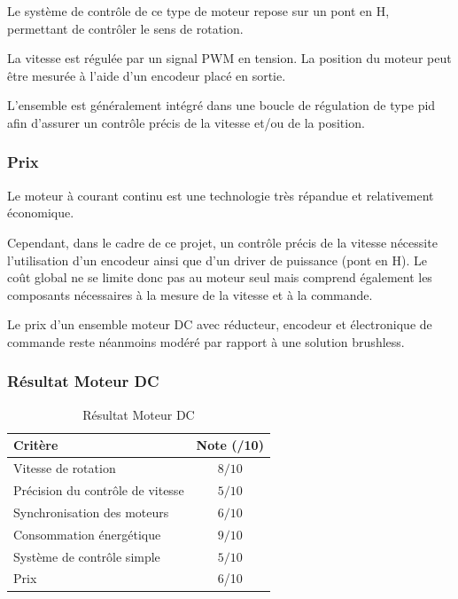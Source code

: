 Le système de contrôle de ce type de moteur repose sur un pont en H, permettant de contrôler le sens de rotation.

La vitesse est régulée par un signal PWM en tension. La position du moteur peut être mesurée à l'aide d'un encodeur placé en sortie.

L'ensemble est généralement intégré dans une boucle de régulation de type \Gls{pid} afin d'assurer un contrôle précis de la vitesse et/ou de la position.
\subsubsection{Prix}

Le moteur à courant continu est une technologie très répandue et relativement économique.

Cependant, dans le cadre de ce projet, un contrôle précis de la vitesse nécessite l'utilisation d'un encodeur ainsi que d'un driver de puissance (pont en H). Le coût global ne se limite donc pas au moteur seul mais comprend également les composants nécessaires à la mesure de la vitesse et à la commande.

Le prix d'un ensemble moteur DC avec réducteur, encodeur et électronique de commande reste néanmoins modéré par rapport à une solution brushless.

\subsubsection{Résultat Moteur DC}

\begin{table}[H]
    \centering
    \begin{tabular}{|l|c|}
        \hline
        \textbf{Critère} & \textbf{Note (/10)} \\
        \hline
        Vitesse de rotation & $8/10$\\
        \hline
        Précision du contrôle de vitesse & $5/10$ \\
        \hline
        Synchronisation des moteurs & $6/10$\\
        \hline
        Consommation énergétique & $9/10$\\
        \hline
        Système de contrôle simple & $5/10$\\
        \hline
        Prix& 6/10\\
        \hline
    \end{tabular}
    \caption{Résultat Moteur DC}
    \label{tab:resultat_moteur_dc}
\end{table}

